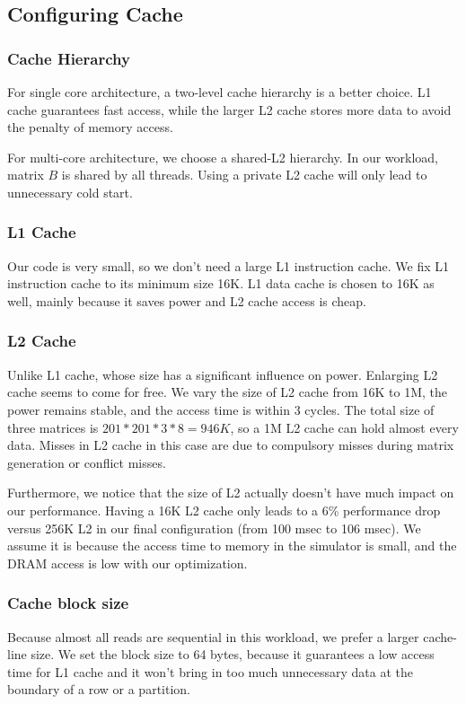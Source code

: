 \documentclass[twocolumn,letterpaper,10pt]{article}
\begin{document}
\subsection{Configuring Cache}

\subsubsection{Cache Hierarchy}
For single core architecture, a two-level cache hierarchy is a better
choice. L1 cache guarantees fast access, while the larger L2 cache stores
more data to avoid the penalty of memory access.

For multi-core architecture, we choose a shared-L2 hierarchy. 
In our workload, matrix $B$ is shared by all
threads. Using a private L2 cache will only lead to unnecessary cold
start.  

\subsubsection{L1 Cache}
Our code is very small, so we don't need a large L1 instruction
cache. We fix L1 instruction cache to its minimum size 16K. L1 data
cache is chosen to 16K as well, mainly because it saves power and L2
cache access is cheap.

\subsubsection{L2 Cache}
Unlike L1 cache, whose size has a significant influence on
power. Enlarging L2 cache seems to come for free. We vary the size of
L2 cache from 16K to 1M, the power remains stable, and the access
time is within 3 cycles. The total size of three matrices is $201 *
201 * 3 * 8 = 946K$, so a 1M L2 cache can hold almost every
data. Misses in L2 cache in this case are due to compulsory misses
during matrix generation or conflict misses.

Furthermore, we notice that the size of L2 actually doesn't have much
impact on our performance. Having a 16K L2 cache only leads to a
6\% performance drop versus 256K L2 in our final configuration (from
100 msec to 106 msec). We assume it is because the
access time to memory in the simulator is small, and the DRAM access
is low with our optimization.

\subsubsection{Cache block size}
Because almost all reads are sequential in this workload, we prefer a larger cache-line size. We set the block size to 64
bytes, because it guarantees a low access time for L1 cache and it won't
bring in too much unnecessary data at the boundary of a row or a partition.
\end{document}
